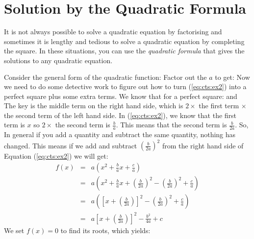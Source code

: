 \section{Solution by the Quadratic Formula}

It is not always possible to solve a quadratic equation by factorising and sometimes it is lengthy and tedious to solve a quadratic equation by completing the square. In these situations, you can use the \textit{quadratic formula} that gives the solutions to any quadratic equation.

Consider the general form of the quadratic function:
Factor out the $a$ to get:
Now we need to do some detective work to figure out how to turn (\ref{eq:cts:ex2}) into a perfect square plus some extra terms. We know that for a perfect square:
and
The key is the middle term on the right hand side, which is $2\times$ the first term $\times$ the second term of the left hand side.
In (\ref{eq:cts:ex2}), we know that the first term is $x$ so $2\times$ the second term is $\frac{b}{a}$. This means that the second term is $\frac{b}{2a}$. So,
In general if you add a quantity and subtract the same quantity, nothing has changed. This means if we add and subtract $\left(\frac{b}{2a}\right)^2$ from the right hand side of Equation (\ref{eq:cts:ex2}) we will get:
\begin{eqnarray}
f(x)&=&a\left(x^2+\frac{b}{a}x+\frac{c}{a}\right)\\
&=&a\left(x^2+\frac{b}{a}x+\left(\frac{b}{2a}\right)^2 - \left(\frac{b}{2a}\right)^2+\frac{c}{a}\right)\\
&=&a\left(\left[x+\left(\frac{b}{2a}\right)\right]^2 - \left(\frac{b}{2a}\right)^2+\frac{c}{a}\right)\\
&=&a\left[x+\left(\frac{b}{2a}\right)\right]^2 - \frac{b^2}{4a} +c
\end{eqnarray}
We set $f(x)=0$ to find its roots, which yields:

